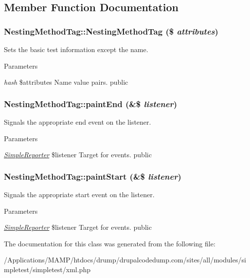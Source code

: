 \subsection{Member Function Documentation}
\hypertarget{class_nesting_method_tag_a7f84bd600d310fea9b0ae676ba4f24d7}{
\subsubsection[{NestingMethodTag}]{\setlength{\rightskip}{0pt plus 5cm}NestingMethodTag::NestingMethodTag (\$ {\em attributes})}}
\label{class_nesting_method_tag_a7f84bd600d310fea9b0ae676ba4f24d7}
Sets the basic test information except the name. 
\begin{DoxyParams}{Parameters}
\item[{\em hash}]\$attributes Name value pairs.  public \end{DoxyParams}
\hypertarget{class_nesting_method_tag_a15ed8db13ff62f4f3f7631212f1b6278}{
\subsubsection[{paintEnd}]{\setlength{\rightskip}{0pt plus 5cm}NestingMethodTag::paintEnd (\&\$ {\em listener})}}
\label{class_nesting_method_tag_a15ed8db13ff62f4f3f7631212f1b6278}
Signals the appropriate end event on the listener. 
\begin{DoxyParams}{Parameters}
\item[{\em \hyperlink{class_simple_reporter}{SimpleReporter}}]\$listener Target for events.  public \end{DoxyParams}
\hypertarget{class_nesting_method_tag_a9d29783caa420bbd786c51e1b400a481}{
\subsubsection[{paintStart}]{\setlength{\rightskip}{0pt plus 5cm}NestingMethodTag::paintStart (\&\$ {\em listener})}}
\label{class_nesting_method_tag_a9d29783caa420bbd786c51e1b400a481}
Signals the appropriate start event on the listener. 
\begin{DoxyParams}{Parameters}
\item[{\em \hyperlink{class_simple_reporter}{SimpleReporter}}]\$listener Target for events.  public \end{DoxyParams}


The documentation for this class was generated from the following file:\begin{DoxyCompactItemize}
\item 
/Applications/MAMP/htdocs/drump/drupalcodedump.com/sites/all/modules/simpletest/simpletest/xml.php\end{DoxyCompactItemize}
